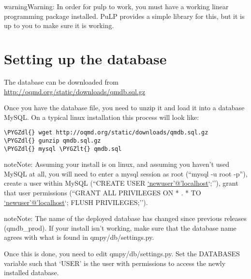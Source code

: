 \documentclass[letterpaper,10pt,english]{sphinxmanual}
\def\PYGZlt{\char`\<}
\def\PYGZdl{\char`\$}
\begin{document}
\begin{notice}{warning}{Warning:}
In order for pulp to work, you must have a working linear programming
package installed. PuLP provides a simple library for this, but it is
up to you to make sure it is working.
\end{notice}


\chapter{Setting up the database}
\label{getting_started:setting-up-the-database}
The database can be downloaded from
\href{http://oqmd.org/static/downloads/qmdb.sql.gz}{http://oqmd.org/static/downloads/qmdb.sql.gz}

Once you have the database file, you need to unzip it and load it into a
database MySQL. On a typical linux installation this process will look like:

\begin{Verbatim}[commandchars=\\\{\}]
\PYGZdl{} wget http://oqmd.org/static/downloads/qmdb.sql.gz
\PYGZdl{} gunzip qmdb.sql.gz
\PYGZdl{} mysql \PYGZlt{} qmdb.sql
\end{Verbatim}

\begin{notice}{note}{Note:}
Assuming your install is on linux, and assuming you haven't used MySQL at
all, you will need to enter a mysql session as root (``mysql -u root -p''),
create a user within MySQL (``CREATE USER \href{mailto:'newuser'@'localhost}{`newuser'@'localhost}`;''), grant
that user permissions (``GRANT ALL PRIVILEGES ON * . * TO
\href{mailto:'newuser'@'localhost}{`newuser'@'localhost}`; FLUSH PRIVILEGES;'').
\end{notice}

\begin{notice}{note}{Note:}
The name of the deployed database has changed since previous releases
(qmdb\_prod). If your install isn't working, make sure that the database
name agrees with what is found in qmpy/db/settings.py.
\end{notice}

Once this is done, you need to edit qmpy/db/settings.py. Set the DATABASES
variable such that `USER' is the user with permissions to access the newly
installed database.
\end{document}
